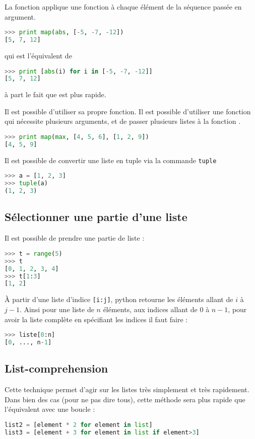 \documentclass[a4paper,twoside]{article}
\begin{document}
La fonction  applique une fonction à chaque élément de la séquence passée en argument.

\begin{lstlisting}[language=python]
>>> print map(abs, [-5, -7, -12])
[5, 7, 12]
\end{lstlisting}
qui est l'équivalent de
\begin{lstlisting}[language=python]
>>> print [abs(i) for i in [-5, -7, -12]]
[5, 7, 12]
\end{lstlisting}
à part le fait que  est plus rapide.

Il est possible d'utiliser sa propre fonction. Il est possible d'utiliser une fonction qui nécessite plusieurs arguments, et de passer plusieurs listes à la fonction .
\begin{lstlisting}[language=python]
>>> print map(max, [4, 5, 6], [1, 2, 9])
[4, 5, 9]
\end{lstlisting}

\bigskip

Il est possible de convertir une liste en tuple via la commande \texttt{tuple}
\begin{lstlisting}[language=python]
>>> a = [1, 2, 3]
>>> tuple(a)
(1, 2, 3)
\end{lstlisting}

\subsection{Sélectionner une partie d'une liste}
Il est possible de prendre une partie de liste :
\begin{lstlisting}[language=python]
>>> t = range(5)
>>> t
[0, 1, 2, 3, 4]
>>> t[1:3]
[1, 2]
\end{lstlisting}

\begin{attention}
À partir d'une liste d'indice \texttt{[i:j]}, python retourne les éléments allant de $i$ à $j-1$. Ainsi pour une liste de $n$ éléments, aux indices allant de $0$ à $n-1$, pour avoir la liste complète en spécifiant les indices il faut faire :
\begin{lstlisting}[language=python]
>>> liste[0:n]
[0, ..., n-1]
\end{lstlisting}
\end{attention}


\subsection{List-comprehension}
Cette technique permet d'agir sur les listes très simplement et très rapidement. Dans bien des cas (pour ne pas dire tous), cette méthode sera plus rapide que l'équivalent avec une boucle :
\begin{lstlisting}[language=python]
list2 = [element * 2 for element in list]
list3 = [element + 3 for element in list if element>3]
\end{lstlisting}
\end{document}
